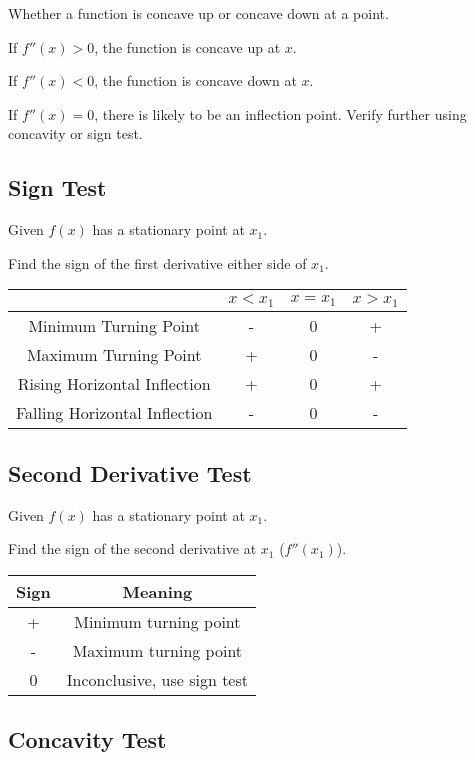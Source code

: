 \documentclass[a4paper,11pt]{article}
\begin{document}
Whether a function is concave up or concave down at a point.

If $f''(x) > 0$, the function is concave up at $x$.

If $f''(x) < 0$, the function is concave down at $x$.

If $f''(x) = 0$, there is likely to be an inflection point. Verify further using
concavity or sign test.


\subsection{Sign Test}

Given $f(x)$ has a stationary point at $x_1$.

Find the sign of the first derivative either side of $x_1$.

\begin{center}
\begin{tabular}{c|c|c|c}
& $x < x_1$ & $x = x_1$ & $x > x_1$ \\
\hline
Minimum Turning Point         & - & 0 & + \\
Maximum Turning Point         & + & 0 & - \\
Rising Horizontal Inflection  & + & 0 & + \\
Falling Horizontal Inflection & - & 0 & - \\
\end{tabular}
\end{center}


\subsection{Second Derivative Test}

Given $f(x)$ has a stationary point at $x_1$.

Find the sign of the second derivative at $x_1$ ($f''(x_1)$).

\begin{center}
\begin{tabular}{c|c}
Sign & Meaning \\
\hline
+ & Minimum turning point \\
- & Maximum turning point \\
0 & Inconclusive, use sign test \\
\end{tabular}
\end{center}


\subsection{Concavity Test}
\end{document}
